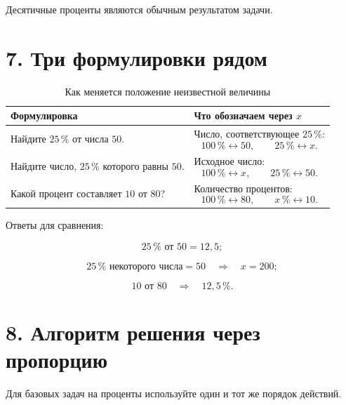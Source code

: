 \documentclass[a4paper,12pt]{article}
\newcommand{\pct}[1]{#1\,\%}
\begin{document}
Десятичные проценты являются обычным результатом задачи.


\section*{\textcolor{darkaccent}{7. Три формулировки рядом}}

\renewcommand{\arraystretch}{1.45}

\begin{table}[h]
\centering
\caption{Как меняется положение неизвестной величины}
\begin{tabularx}{\linewidth}{>{\raggedright\arraybackslash}X
                             >{\raggedright\arraybackslash}X}
\toprule
\textbf{Формулировка} & \textbf{Что обозначаем через \(x\)} \\
\midrule

Найдите \(\pct{25}\) от числа \(50\).
&
Число, соответствующее \(\pct{25}\):
\[
\pct{100}\leftrightarrow50,\qquad
\pct{25}\leftrightarrow x.
\]
\\

Найдите число, \(\pct{25}\) которого равны \(50\).
&
Исходное число:
\[
\pct{100}\leftrightarrow x,\qquad
\pct{25}\leftrightarrow50.
\]
\\

Какой процент составляет \(10\) от \(80\)?
&
Количество процентов:
\[
\pct{100}\leftrightarrow80,\qquad
x\,\%\leftrightarrow10.
\]
\\

\bottomrule
\end{tabularx}
\end{table}

Ответы для сравнения:

\[
\pct{25}\text{ от }50=12{,}5;
\]

\[
\pct{25}\text{ некоторого числа}=50
\quad\Longrightarrow\quad
x=200;
\]

\[
10\text{ от }80
\quad\Longrightarrow\quad
\pct{12,5}.
\]


\section*{\textcolor{darkaccent}{8. Алгоритм решения через пропорцию}}

Для базовых задач на проценты используйте один и тот же порядок действий.
\end{document}
